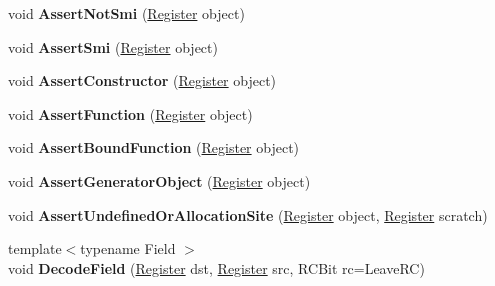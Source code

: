 \begin{DoxyCompactItemize}
void {\bfseries Assert\+Not\+Smi} (\mbox{\hyperlink{classv8_1_1internal_1_1Register}{Register}} object)
\item 
\mbox{\label{classv8_1_1internal_1_1MacroAssembler_aca8963bd0a98454d6ad0e4aa34d8cab8}} 
void {\bfseries Assert\+Smi} (\mbox{\hyperlink{classv8_1_1internal_1_1Register}{Register}} object)
\item 
\mbox{\label{classv8_1_1internal_1_1MacroAssembler_a6a0f31c1173192d0ff1e325d711e099f}} 
void {\bfseries Assert\+Constructor} (\mbox{\hyperlink{classv8_1_1internal_1_1Register}{Register}} object)
\item 
\mbox{\label{classv8_1_1internal_1_1MacroAssembler_aa8d13935f0543f10e23d7b44595f48bb}} 
void {\bfseries Assert\+Function} (\mbox{\hyperlink{classv8_1_1internal_1_1Register}{Register}} object)
\item 
\mbox{\label{classv8_1_1internal_1_1MacroAssembler_acbd0894b4e268684a580f99882497aed}} 
void {\bfseries Assert\+Bound\+Function} (\mbox{\hyperlink{classv8_1_1internal_1_1Register}{Register}} object)
\item 
\mbox{\label{classv8_1_1internal_1_1MacroAssembler_aa71ed557199e69728a422efb18e8fc65}} 
void {\bfseries Assert\+Generator\+Object} (\mbox{\hyperlink{classv8_1_1internal_1_1Register}{Register}} object)
\item 
\mbox{\label{classv8_1_1internal_1_1MacroAssembler_ac5a6e24ffce5d432cf0bf668b8460ff5}} 
void {\bfseries Assert\+Undefined\+Or\+Allocation\+Site} (\mbox{\hyperlink{classv8_1_1internal_1_1Register}{Register}} object, \mbox{\hyperlink{classv8_1_1internal_1_1Register}{Register}} scratch)
\item 
\mbox{\label{classv8_1_1internal_1_1MacroAssembler_ad4c5d856d8ad3b957af25427948b335a}} 
{\footnotesize template$<$typename Field $>$ }\\void {\bfseries Decode\+Field} (\mbox{\hyperlink{classv8_1_1internal_1_1Register}{Register}} dst, \mbox{\hyperlink{classv8_1_1internal_1_1Register}{Register}} src, R\+C\+Bit rc=Leave\+RC)

\end{DoxyCompactItemize}
